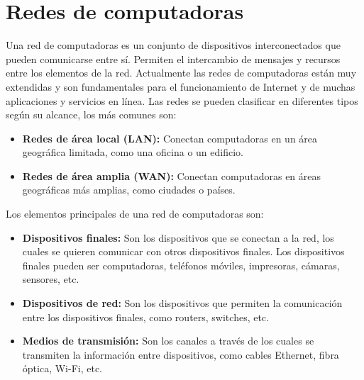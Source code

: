 \section{Redes de computadoras}
Una red de computadoras es un conjunto de dispositivos interconectados que pueden comunicarse entre sí. Permiten el intercambio de mensajes y recursos entre los elementos de la red. Actualmente las redes de computadoras están muy extendidas y son fundamentales para el funcionamiento de Internet y de muchas aplicaciones y servicios en línea.
Las redes se pueden clasificar en diferentes tipos según su alcance, los más comunes son:
\begin{itemize}
	\item \textbf{Redes de área local (LAN):} Conectan computadoras en un área geográfica limitada, como una oficina o un edificio.
	\item \textbf{Redes de área amplia (WAN):} Conectan computadoras en áreas geográficas más amplias, como ciudades o países.
\end{itemize}

Los elementos principales de una red de computadoras son:
\begin{itemize}
	\item \textbf{Dispositivos finales:} Son los dispositivos que se conectan a la red, los cuales se quieren comunicar con otros dispositivos finales. Los dispositivos finales pueden ser computadoras, teléfonos móviles, impresoras, cámaras, sensores, etc.
	\item \textbf{Dispositivos de red:} Son los dispositivos que permiten la comunicación entre los dispositivos finales, como routers, switches, etc.
	\item \textbf{Medios de transmisión:} Son los canales a través de los cuales se transmiten la información entre dispositivos, como cables Ethernet, fibra óptica, Wi-Fi, etc.
\end{itemize}

